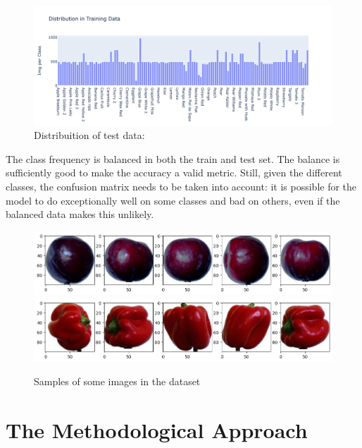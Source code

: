\begin{figure}[H]
	\centering
	\includegraphics[width=\textwidth]{Distribution.png}
	\caption{Distribuition of test data:}
	\label{img:distribuition_of_test_data}
\end{figure}

The class frequency is balanced in both the train and test set. The balance is sufficiently good to make the accuracy a valid metric. Still, given the different classes, the confusion matrix needs to be taken into account: it is possible for the model to do exceptionally well on some classes and bad on others, even if the balanced data makes this unlikely.

\begin{figure}[H]
	\centering
	\includegraphics[width=\textwidth]{imgExample.png}
	\includegraphics[width=\textwidth]{imgExample2.png}
	\caption{Samples of some images in the dataset}
	\label{img:examples}
\end{figure}

\section{The Methodological Approach}

